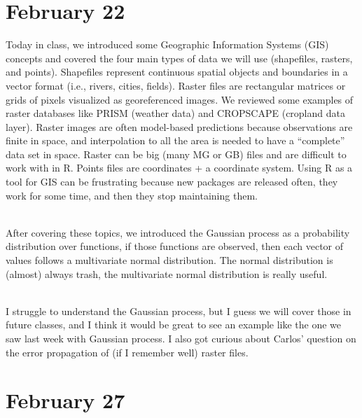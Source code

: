 \documentclass[
]{book}
\begin{document}
\hypertarget{february-22}{%
\section{February 22}\label{february-22}}

Today in class, we introduced some Geographic Information Systems (GIS) concepts and covered the four main types of data we will use (shapefiles, rasters, and points). Shapefiles represent continuous spatial objects and boundaries in a vector format (i.e., rivers, cities, fields). Raster files are rectangular matrices or grids of pixels visualized as georeferenced images. We reviewed some examples of raster databases like PRISM (weather data) and CROPSCAPE (cropland data layer). Raster images are often model-based predictions because observations are finite in space, and interpolation to all the area is needed to have a ``complete'' data set in space. Raster can be big (many MG or GB) files and are difficult to work with in R. Points files are coordinates + a coordinate system. Using R as a tool for GIS can be frustrating because new packages are released often, they work for some time, and then they stop maintaining them.\\
\strut \\
After covering these topics, we introduced the Gaussian process as a probability distribution over functions, if those functions are observed, then each vector of values follows a multivariate normal distribution. The normal distribution is (almost) always trash, the multivariate normal distribution is really useful.\\
\strut \\
I struggle to understand the Gaussian process, but I guess we will cover those in future classes, and I think it would be great to see an example like the one we saw last week with Gaussian process. I also got curious about Carlos' question on the error propagation of (if I remember well) raster files.

\hypertarget{february-27}{%
\section{February 27}\label{february-27}}
\end{document}
